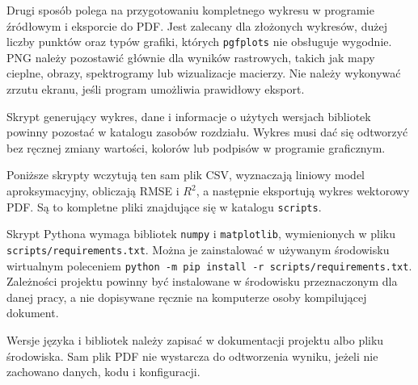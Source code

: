 Drugi sposób polega na przygotowaniu kompletnego wykresu w programie źródłowym i eksporcie do PDF. Jest zalecany dla złożonych wykresów, dużej liczby punktów oraz typów grafiki, których \texttt{pgfplots} nie obsługuje wygodnie. PNG należy pozostawić głównie dla wyników rastrowych, takich jak mapy cieplne, obrazy, spektrogramy lub wizualizacje macierzy. Nie należy wykonywać zrzutu ekranu, jeśli program umożliwia prawidłowy eksport.

Skrypt generujący wykres, dane i informacje o użytych wersjach bibliotek powinny pozostać w katalogu zasobów rozdziału. Wykres musi dać się odtworzyć bez ręcznej zmiany wartości, kolorów lub podpisów w programie graficznym.

Poniższe skrypty wczytują ten sam plik CSV, wyznaczają liniowy model aproksymacyjny, obliczają RMSE i \(R^2\), a następnie eksportują wykres wektorowy PDF. Są to kompletne pliki znajdujące się w katalogu \texttt{scripts}.

Skrypt Pythona wymaga bibliotek \texttt{numpy} i \texttt{matplotlib}, wymienionych w pliku \texttt{scripts/requirements.txt}. Można je zainstalować w używanym środowisku wirtualnym poleceniem \verb|python -m pip install -r scripts/requirements.txt|. Zależności projektu powinny być instalowane w środowisku przeznaczonym dla danej pracy, a nie dopisywane ręcznie na komputerze osoby kompilującej dokument.





Wersje języka i bibliotek należy zapisać w dokumentacji projektu albo pliku środowiska. Sam plik PDF nie wystarcza do odtworzenia wyniku, jeżeli nie zachowano danych, kodu i konfiguracji.

\section{}

\subsection{}

